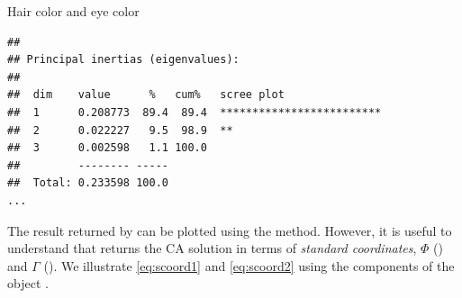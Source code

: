 \documentclass[11pt]{book}
\renewenvironment{knitrout}{\small\renewcommand{\baselinestretch}{.85}}{} %
\begin{document}
\begin{Example}[haireye3]{Hair color and eye color}
\begin{knitrout}
\color{fgcolor}\begin{kframe}
\begin{alltt}
\end{alltt}
\begin{verbatim}
## 
## Principal inertias (eigenvalues):
## 
##  dim    value      %   cum%   scree plot               
##  1      0.208773  89.4  89.4  *************************
##  2      0.022227   9.5  98.9  **                       
##  3      0.002598   1.1 100.0                           
##         -------- -----                                 
##  Total: 0.233598 100.0                                 
...
\end{verbatim}
\end{kframe}
\end{knitrout}

The result returned by  can be plotted using the  method. 
However, it is useful to understand that  returns the CA solution
in terms of \emph{standard coordinates}, $\Phi$ () 
and $\Gamma$ (). We illustrate \eqref{eq:scoord1}
and \eqref{eq:scoord2} using the components of the  object
.


\end{Example}
\end{document}
